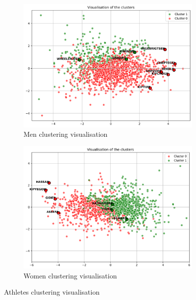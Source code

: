 \documentclass[10pt, a4paper]{article}
\begin{document}
\begin{figure}[htb]
    \centering
    \begin{subfigure}[b]{0.45\linewidth}
        \includegraphics[width=\linewidth]{Data/Figures/Men_Athletes_clustering.png}
        \caption{Men clustering visualisation}
        \label{fig:men-clustering}
    \end{subfigure}
    \hfill
    \begin{subfigure}[b]{0.45\linewidth}
        \includegraphics[width=\linewidth]{Data/Figures/Women_Athletes_clustering.png}
        \caption{Women clustering visualisation}
        \label{fig:women-clustering}
    \end{subfigure}
    \caption{Athletes clustering visualisation}
    \label{fig:clustering}
\end{figure}
\end{document}
